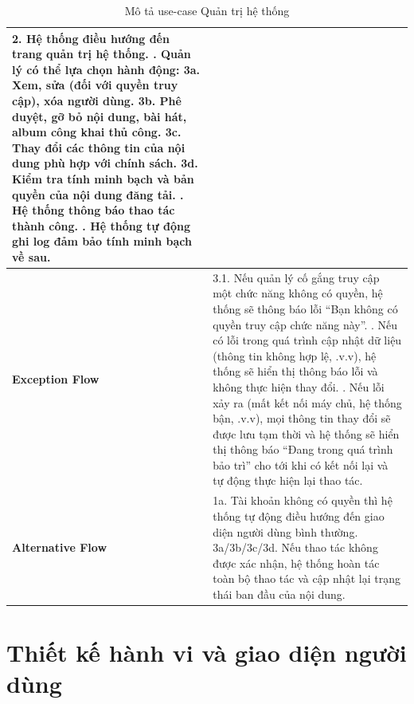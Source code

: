 \documentclass[a4paper]{article}
\newcommand{\cach}{\hspace*{1.5em}\ignorespaces}
\begin{document}
\begin{table}[H]
\begin{tabularx}{\textwidth}{|l|X|}
		2. Hệ thống điều hướng đến trang quản trị hệ thống. \newline
		3. Quản lý có thể lựa chọn hành động: \newline
		\cach 3a. Xem, sửa (đối với quyền truy cập), xóa người dùng. \newline
		\cach 3b. Phê duyệt, gỡ bỏ nội dung, bài hát, album công khai thủ công. \newline
		\cach 3c. Thay đổi các thông tin của nội dung phù hợp với chính sách. \newline
		\cach 3d. Kiểm tra tính minh bạch và bản quyền của nội dung đăng tải. \newline
		4. Hệ thống thông báo thao tác thành công. \newline
		5. Hệ thống tự động ghi log đảm bảo tính minh bạch về sau.                                                                                                                                                                                  \\ \hline
		\textbf{Exception Flow}
		                       & 3.1. Nếu quản lý cố gắng truy cập một chức năng không có quyền, hệ thống sẽ thông báo lỗi ``Bạn không có quyền truy cập chức năng này''. \newline
		3.2. Nếu có lỗi trong quá trình cập nhật dữ liệu (thông tin không hợp lệ, .v.v), hệ thống sẽ hiển thị thông báo lỗi và không thực hiện thay đổi. \newline
		3.3. Nếu lỗi xảy ra (mất kết nối máy chủ, hệ thống bận, .v.v), mọi thông tin thay đổi sẽ được lưu tạm thời và hệ thống sẽ hiển thị thông báo ``Đang trong quá trình bảo trì'' cho tới khi có kết nối lại và tự động thực hiện lại thao tác. \\ \hline
		\textbf{Alternative Flow}
		                       & 1a. Tài khoản không có quyền thì hệ thống tự động điều hướng đến giao diện người dùng bình thường. \newline
		3a/3b/3c/3d. Nếu thao tác không được xác nhận, hệ thống hoàn tác toàn bộ thao tác và cập nhật lại trạng thái ban đầu của nội dung.                                                                                                          \\ \hline
	\end{tabularx}
	\caption{Mô tả use-case Quản trị hệ thống}
\end{table}
\newpage
\section{Thiết kế hành vi và giao diện người dùng}
\end{document}
